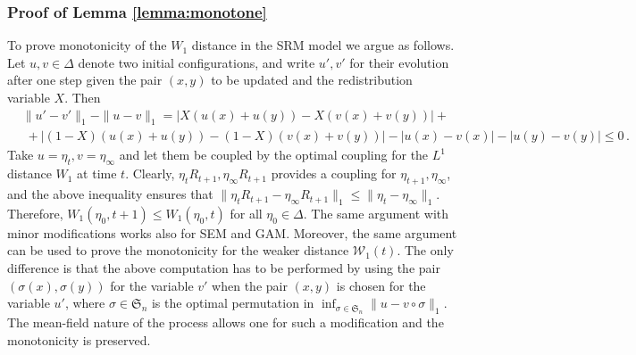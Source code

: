 \documentclass[11pt,reqno]{amsart}
\theoremstyle{remark}
\theoremstyle{definition}
\numberwithin{equation}{section}
\numberwithin{figure}{section}
\newcommand{\cW}{\ensuremath{\mathcal W}}
\let\D=\Delta \let\F=\Phi  \let\G=\Gamma  \let\L=\Lambda \let\The=\Theta
\begin{document}
\subsubsection{Proof of Lemma \ref{lemma:monotone}}
To prove monotonicity of the $W_1$ distance in the SRM model we argue as follows. Let $u,v\in \D$ denote two initial configurations, and write $u',v'$ for their evolution after one step given the pair $(x,y)$ to be updated and the redistribution variable $X$. Then 
\begin{align*}
&\|u'-v'\|_1 -\|u-v\|_1  = |X(u(x)+u(y))- X(v(x)+v(y))| +\\
&\; +  |(1-X)(u(x)+u(y))- (1-X)(v(x)+v(y))| - |u(x)-v(x)|- |u(y)-v(y)| \le 0\,.
\end{align*}
Take $u=\eta_t,v=\eta_\infty$ and let them be coupled by the optimal coupling for the $L^1$ distance $W_1$ at time $t$. Clearly,  $\eta_tR_{t+1}, \eta_\infty R_{t+1}$ provides a coupling for $\eta_{t+1},\eta_\infty$, and the above inequality ensures that  $ \|\eta_tR_{t+1}-\eta_\infty R_{t+1}\|_1\le \|\eta_{t}-\eta_\infty\|_1$. Therefore, $W_1(\eta_0,t+1)\le  W_1(\eta_0,t)$ for all $\eta_0\in\D$. The same argument with minor modifications works also for SEM and GAM. Moreover, the same argument can be used to prove the monotonicity for the weaker distance $\cW_1(t)$. The only difference is that the above computation has to be performed by using the pair $(\sigma(x),\sigma(y))$ for the variable $v'$ when the pair $(x,y)$ is chosen for the variable $u'$, where  $\sigma\in \mathfrak S_n$ is the optimal permutation in $\inf_{\sigma\in\mathfrak{S}_n} \|u-v\circ \sigma\|_1$. The mean-field nature of the process allows one for such a modification and the monotonicity is preserved. 
\end{document}
